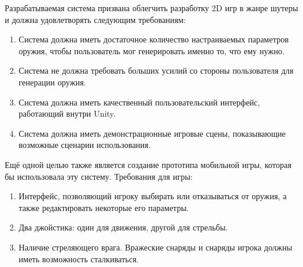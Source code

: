 Разрабатываемая система призвана облегчить разработку 2D игр в жанре шутеры и должна удовлетворять следующим требованиям:
\begin{enumerate}
    \item Система должна иметь достаточное количество настраиваемых параметров оружия, чтобы пользователь мог генерировать именно то, что ему нужно.
    \item Система не должна требовать больших усилий со стороны пользователя для генерации оружия.
    \item Система должна иметь качественный пользовательский интерфейс, работающий внутри Unity.
    \item Система должна иметь демонстрационные игровые сцены, показывающие возможные сценарии использования.
\end{enumerate}

\vspace{5mm}

Ещё одной целью также является создание прототипа мобильной игры, которая бы использовала эту систему. Требования для игры:
\begin{enumerate}
    \item Интерфейс, позволяющий игроку выбирать или отказываться от оружия, а также редактировать некоторые его параметры.
    \item Два джойстика: один для движения, другой для стрельбы.
    \item Наличие стреляющего врага. Вражеские снаряды и снаряды игрока должны иметь возможность сталкиваться.
\end{enumerate}





